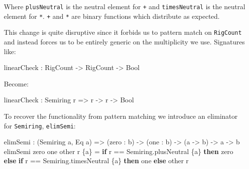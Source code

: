 \documentclass[
]{article}
\newenvironment{Shaded}{}{}
\newcommand{\DataTypeTok}[1]{\textcolor[rgb]{0.56,0.13,0.00}{#1}}
\newcommand{\KeywordTok}[1]{\textcolor[rgb]{0.00,0.44,0.13}{\textbf{#1}}}
\newcommand{\NormalTok}[1]{#1}
\newcommand{\OperatorTok}[1]{\textcolor[rgb]{0.40,0.40,0.40}{#1}}
\newcommand{\OtherTok}[1]{\textcolor[rgb]{0.00,0.44,0.13}{#1}}
\begin{document}
Where \texttt{plusNeutral} is the neutral element for
\texttt{\textbar{}+\textbar{}} and \texttt{timesNeutral} is the neutral
element for \texttt{\textbar{}*\textbar{}}.
\texttt{\textbar{}+\textbar{}} and \texttt{\textbar{}*\textbar{}} are
binary functions which distribute as expected.

This change is quite disruptive since it forbids us to pattern match on
\texttt{RigCount} and instead forces us to be entirely generic on the
multiplicity we use. Signatures like:

\begin{Shaded}
\begin{Highlighting}[]
\NormalTok{linearCheck }\OperatorTok{:} \DataTypeTok{RigCount} \OtherTok{{-}\textgreater{}} \DataTypeTok{RigCount} \OtherTok{{-}\textgreater{}} \DataTypeTok{Bool}
\end{Highlighting}
\end{Shaded}

Become:

\begin{Shaded}
\begin{Highlighting}[]
\NormalTok{linearCheck }\OperatorTok{:} \DataTypeTok{Semiring}\NormalTok{ r }\OtherTok{=\textgreater{}}\NormalTok{ r }\OtherTok{{-}\textgreater{}}\NormalTok{ r }\OtherTok{{-}\textgreater{}} \DataTypeTok{Bool}
\end{Highlighting}
\end{Shaded}

To recover the functionality from pattern matching we introduce an
eliminator for \texttt{Semiring}, \texttt{elimSemi}:

\begin{Shaded}
\begin{Highlighting}[]
\NormalTok{elimSemi }\OperatorTok{:}\NormalTok{ (}\DataTypeTok{Semiring}\NormalTok{ a, }\DataTypeTok{Eq}\NormalTok{ a) }\OtherTok{=\textgreater{}}\NormalTok{ (zero }\OperatorTok{:}\NormalTok{ b) }\OtherTok{{-}\textgreater{}}\NormalTok{ (one }\OperatorTok{:}\NormalTok{ b) }\OtherTok{{-}\textgreater{}}\NormalTok{ (a }\OtherTok{{-}\textgreater{}}\NormalTok{ b) }
       \OtherTok{{-}\textgreater{}}\NormalTok{ a }\OtherTok{{-}\textgreater{}}\NormalTok{ b}
\NormalTok{elimSemi zero one other r \{a\} }\OtherTok{=}
  \KeywordTok{if}\NormalTok{ r }\OperatorTok{==}\NormalTok{ Semiring.plusNeutral \{a\}}
     \KeywordTok{then}\NormalTok{ zero}
     \KeywordTok{else} \KeywordTok{if}\NormalTok{ r }\OperatorTok{==}\NormalTok{ Semiring.timesNeutral \{a\}}
             \KeywordTok{then}\NormalTok{ one}
             \KeywordTok{else}\NormalTok{ other r}
\end{Highlighting}
\end{Shaded}
\end{document}
